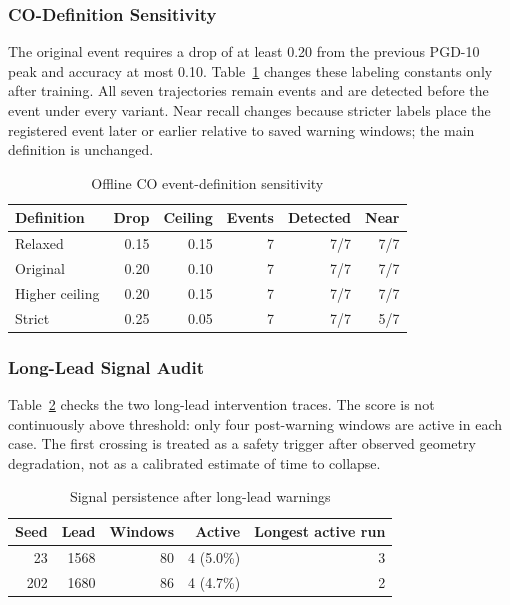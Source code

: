\subsubsection{CO-Definition Sensitivity}
The original event requires a drop of at least 0.20 from the previous PGD-10
peak and accuracy at most 0.10. Table~\ref{tab:event-sensitivity} changes these
labeling constants only after training. All seven trajectories remain events
and are detected before the event under every variant. Near recall changes
because stricter labels place the registered event later or earlier relative
to saved warning windows; the main definition is unchanged.

\begin{table}[h]
\centering
\caption{Offline CO event-definition sensitivity}
\label{tab:event-sensitivity}
\scriptsize
\setlength{\tabcolsep}{3pt}
\begin{tabular}{lrrrrr}
\toprule
Definition & Drop & Ceiling & Events & Detected & Near \\
\midrule
Relaxed & 0.15 & 0.15 & 7 & 7/7 & 7/7 \\
Original & 0.20 & 0.10 & 7 & 7/7 & 7/7 \\
Higher ceiling & 0.20 & 0.15 & 7 & 7/7 & 7/7 \\
Strict & 0.25 & 0.05 & 7 & 7/7 & 5/7 \\
\bottomrule
\end{tabular}
\end{table}

\subsubsection{Long-Lead Signal Audit}
Table~\ref{tab:persistence} checks the two long-lead intervention traces. The
score is not continuously above threshold: only four post-warning windows are
active in each case. The first crossing is treated as a safety trigger after
observed geometry degradation, not as a calibrated estimate of time to collapse.

\begin{table}[h]
\centering
\caption{Signal persistence after long-lead warnings}
\label{tab:persistence}
\scriptsize
\setlength{\tabcolsep}{4pt}
\begin{tabular}{rrrrr}
\toprule
Seed & Lead & Windows & Active & Longest active run \\
\midrule
23  & 1568 & 80 & 4 (5.0\%) & 3 \\
202 & 1680 & 86 & 4 (4.7\%) & 2 \\
\bottomrule
\end{tabular}
\end{table}
